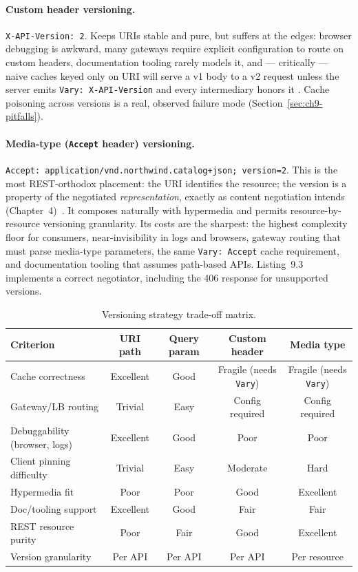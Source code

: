 \paragraph{Custom header versioning.} \texttt{X-API-Version: 2}. Keeps URIs
stable and pure, but suffers at the edges: browser debugging is awkward,
many gateways require explicit configuration to route on custom headers,
documentation tooling rarely models it, and --- critically --- naive caches
keyed only on URI will serve a v1 body to a v2 request unless the server
emits \texttt{Vary: X-API-Version} and every intermediary honors it
\cite{rfc9110}. Cache poisoning across versions is a real, observed failure
mode (Section~\ref{sec:ch9-pitfalls}).

\paragraph{Media-type (\texttt{Accept} header) versioning.}
\texttt{Accept: application/vnd.northwind.catalog+json; version=2}. This is
the most REST-orthodox placement: the URI identifies the resource; the
version is a property of the negotiated \emph{representation}, exactly as
content negotiation intends (Chapter~4)~\cite{rfc9110}. It composes naturally
with hypermedia and permits resource-by-resource versioning granularity. Its
costs are the sharpest: the highest complexity floor for consumers,
near-invisibility in logs and browsers, gateway routing that must parse
media-type parameters, the same \texttt{Vary: Accept} cache requirement, and
documentation tooling that assumes path-based APIs. Listing~9.3 implements a
correct negotiator, including the 406 response for unsupported versions.

\begin{table}[ht]
  \centering
  \small
  \begin{tabularx}{\textwidth}{X c c c c}
    \toprule
    \textbf{Criterion} & \textbf{URI path} & \textbf{Query param} &
      \textbf{Custom header} & \textbf{Media type} \\
    \midrule
    Cache correctness & Excellent & Good & Fragile (needs \texttt{Vary}) &
      Fragile (needs \texttt{Vary}) \\
    Gateway/LB routing & Trivial & Easy & Config required & Config required \\
    Debuggability (browser, logs) & Excellent & Good & Poor & Poor \\
    Client pinning difficulty & Trivial & Easy & Moderate & Hard \\
    Hypermedia fit & Poor & Poor & Good & Excellent \\
    Doc/tooling support & Excellent & Good & Fair & Fair \\
    REST resource purity & Poor & Fair & Good & Excellent \\
    Version granularity & Per API & Per API & Per API & Per resource \\
    \bottomrule
  \end{tabularx}
  \caption{Versioning strategy trade-off matrix.}
  \label{tab:ch9-matrix}
\end{table}


